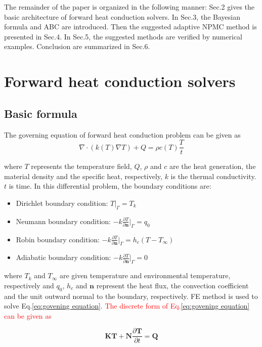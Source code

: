 \documentclass[review]{elsarticle}
\begin{document}
The remainder of the paper is organized in the following manner: Sec.2 gives the basic architecture of forward heat conduction solvers. In Sec.3, the Bayesian formula and ABC are introduced. Then the suggested adaptive NPMC method is presented in Sec.4. In Sec.5, the suggested methods are verified by numerical examples. Conclusion are summarized in Sec.6.


\section{Forward heat conduction solvers}
\subsection{Basic formula}
The governing equation of forward heat conduction problem can be given as
\begin{equation}
    \nabla \cdot (k(T)\nabla T) + Q  = \rho c(T) \frac{T}{t}
    \label{eq:govening equation}
\end{equation}

\noindent where $T$ represents the temperature field, $Q$, $\rho$ and $c$ are the heat generation, the material density and the specific heat, respectively, $k$ is the thermal conductivity. $t$ is time. In this differential problem, the boundary conditions are:
\begin{itemize}
    \item Dirichlet boundary condition: $T|_{\Gamma} = T_k$
    \item Neumann boundary condition: $-k \frac{\partial T}{\partial \mathbf{n}}|_{\Gamma}=q_0$
    \item Robin boundary condition: $-k \frac{\partial T}{\partial \mathbf{n}}|_\Gamma=h_c (T-T_{\infty})$
    \item Adiabatic boundary condition: $-k \frac{\partial T}{\partial \mathbf{n}}|_\Gamma=0$
\end{itemize}
\noindent where $T_k$ and $T_\infty$ are given temperature and environmental temperature, respectively and $q_0$, $h_c$ and $\mathbf{n}$ represent the heat flux, the convection coefficient and the unit outward normal to the boundary, respectively. FE method is used to solve Eq.\ref{eq:govening equation}. \textcolor{red}{The discrete form of Eq.\ref{eq:govening equation} can be given as}

\begin{equation}
    \mathbf{K} \mathbf{T}+\mathbf{N}\frac{\partial \mathbf{T}}{\partial t} = \mathbf{Q}
    \label{eq:FEM}
\end{equation}
\end{document}
